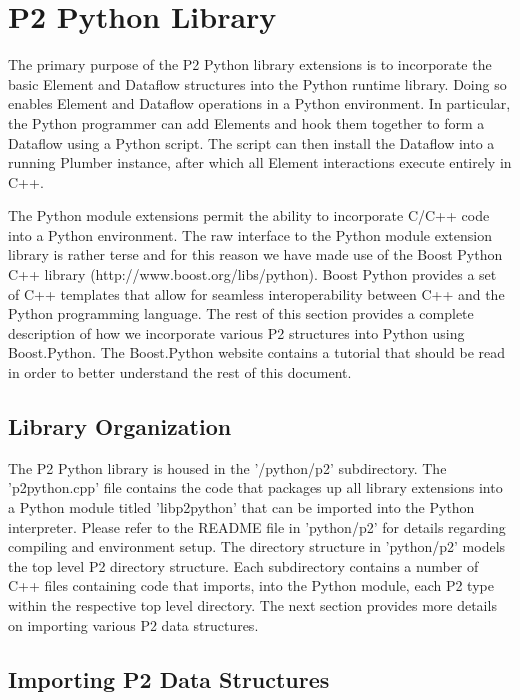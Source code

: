 \documentclass[12pt]{article}
\begin{document}
\section{P2 Python Library}
\label{sec:python}

The primary purpose of the P2 Python library extensions is to incorporate 
the basic Element and Dataflow structures into the Python runtime library. Doing so
enables Element and Dataflow operations in a Python environment. In particular,
the Python programmer can add Elements and hook them together to form a 
Dataflow using a Python script. The script can then install the Dataflow into a
running Plumber instance, after which all Element interactions execute entirely in 
C++. 

The Python module extensions permit the ability to incorporate C/C++ code
into a Python environment. The raw interface to the Python module extension library is
rather terse and for this reason we have made use of the Boost Python C++ 
library (http://www.boost.org/libs/python). Boost Python provides a set of C++ 
templates that allow for seamless interoperability between C++ and the Python
programming language. The rest of this section provides a complete description
of how we incorporate various P2 structures into Python using Boost.Python. The
Boost.Python website contains a tutorial that should be read in order to better 
understand the rest of this document.

\subsection{Library Organization}

The P2 Python library is housed in the '/python/p2' subdirectory. The 'p2python.cpp'
file contains the code that packages up all library extensions into a Python module
titled 'libp2python' that can be imported into the Python interpreter. Please refer
to the README file in 'python/p2' for details regarding compiling and environment
setup. The directory structure in 'python/p2' models the top level P2 directory 
structure. Each subdirectory contains a number of C++ files containing code that
imports, into the Python module, each P2 type within the respective top 
level directory. The next section provides more details on importing various P2
data structures.


\subsection{Importing P2 Data Structures}
\end{document}
